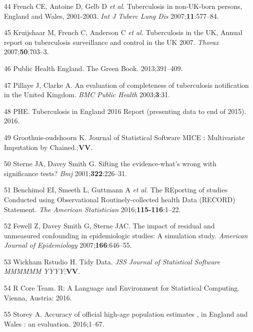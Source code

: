 \documentclass[11pt,twoside]{bristolthesis}
\begin{document}
  \leavevmode\hypertarget{ref-French2007}{}%
  44 French CE, Antoine D, Gelb D \emph{et al.} Tuberculosis in non-UK-born persons, England and Wales, 2001-2003. \emph{Int J Tuberc Lung Dis} 2007;\textbf{11}:577--84.
  
  \leavevmode\hypertarget{ref-Kriujshaar2007}{}%
  45 Kruijshaar M, French C, Anderson C \emph{et al.} Tuberculosis in the UK, Annual report on tuberculosis surveillance and control in the UK 2007. \emph{Thorax} 2007;\textbf{50}:703--3.
  
  \leavevmode\hypertarget{ref-PublicHealthEngland2011a}{}%
  46 Public Health England. The Green Book. 2013;391--409.
  
  \leavevmode\hypertarget{ref-Pillaye2003}{}%
  47 Pillaye J, Clarke A. An evaluation of completeness of tuberculosis notification in the United Kingdom. \emph{BMC Public Health} 2003;\textbf{3}:31.
  
  \leavevmode\hypertarget{ref-PHE2016}{}%
  48 PHE. Tuberculosis in England 2016 Report (presenting data to end of 2015). 2016.
  
  \leavevmode\hypertarget{ref-Groothuis-oudshoorn}{}%
  49 Groothuis-oudshoorn K. Journal of Statistical Software MICE : Multivariate Imputation by Chained.;\textbf{VV}.
  
  \leavevmode\hypertarget{ref-Sterne2001}{}%
  50 Sterne JA, Davey Smith G. Sifting the evidence-what's wrong with significance tests? \emph{Bmj} 2001;\textbf{322}:226--31.
  
  \leavevmode\hypertarget{ref-Benchimol2016a}{}%
  51 Benchimol EI, Smeeth L, Guttmann A \emph{et al.} The REporting of studies Conducted using Observational Routinely-collected health Data (RECORD) Statement. \emph{The American Statistician} 2016;\textbf{115-116}:1--22.
  
  \leavevmode\hypertarget{ref-Fewell2007}{}%
  52 Fewell Z, Davey Smith G, Sterne JAC. The impact of residual and unmeasured confounding in epidemiologic studies: A simulation study. \emph{American Journal of Epidemiology} 2007;\textbf{166}:646--55.
  
  \leavevmode\hypertarget{ref-Wickham2015}{}%
  53 Wickham Rstudio H. Tidy Data. \emph{JSS Journal of Statistical Software MMMMMM YYYY};\textbf{VV}.
  
  \leavevmode\hypertarget{ref-R}{}%
  54 R Core Team. R: A Language and Environment for Statistical Computing. Vienna, Austria: 2016.
  
  \leavevmode\hypertarget{ref-storey2016}{}%
  55 Storey A. Accuracy of official high-age population estimates , in England and Wales : an evaluation. 2016;1--67.
  
\end{document}
